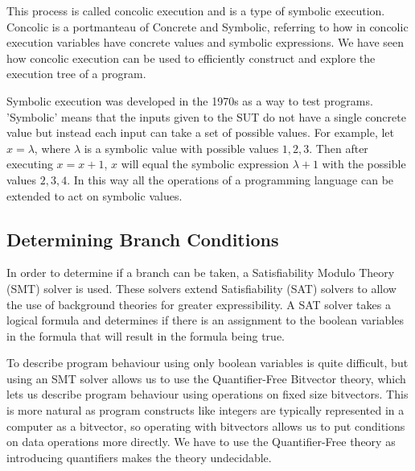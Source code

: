 \documentclass[12pt,twoside]{report}
\begin{document}
This process is called concolic execution and is a type of symbolic execution. Concolic is a portmanteau of Concrete and Symbolic, referring to how in concolic execution variables have concrete values and symbolic expressions. We have seen how concolic execution can be used to efficiently construct and explore the execution tree of a program. 

Symbolic execution was developed in the 1970s \cite{10.1145/800027.808444, 10.1145/360248.360252, 1702443, 10.1145/800027.808445} as a way to test programs. 'Symbolic' means that the inputs given to the SUT do not have a single concrete value but instead each input can take a set of possible values. For example, let $x = \lambda$, where $\lambda$ is a symbolic value with possible values $1,2,3$. Then after executing $x = x + 1$, $x$ will equal the symbolic expression $\lambda + 1$ with the possible values $2,3,4$. In this way all the operations of a programming language can be extended to act on symbolic values.

\subsection{Determining Branch Conditions}
In order to determine if a branch can be taken, a Satisfiability Modulo Theory (SMT) solver \cite{Barrett2018} is used. These solvers extend Satisfiability (SAT) solvers to allow the use of background theories for greater expressibility. A SAT solver \cite{10.1007/978-3-540-24605-3_37} takes a logical formula and determines if there is an assignment to the boolean variables in the formula that will result in the formula being true. 
 

To describe program behaviour using only boolean variables is quite difficult, but using an SMT solver allows us to use the Quantifier-Free Bitvector theory, which lets us describe program behaviour using operations on fixed size bitvectors. This is more natural as program constructs like integers are typically represented in a computer as a bitvector, so operating with bitvectors allows us to put conditions on data operations more directly. We have to use the Quantifier-Free theory as introducing quantifiers makes the theory undecidable.

\end{document}
